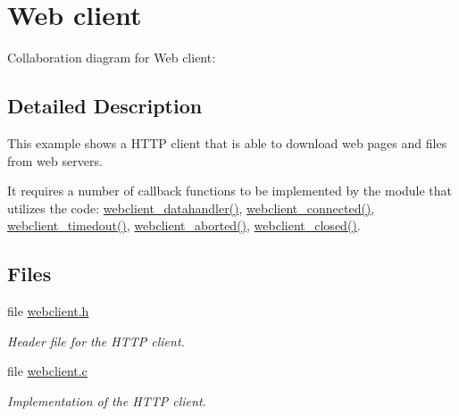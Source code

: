 \hypertarget{a00079}{
\section{Web client}
\label{a00079}
}


Collaboration diagram for Web client:

\subsection{Detailed Description}
This example shows a HTTP client that is able to download web pages and files from web servers. 

It requires a number of callback functions to be implemented by the module that utilizes the code: \hyperlink{a00079_gc4b119801e50cc1824498a1cdf9adc37}{webclient\_\-datahandler()}, \hyperlink{a00079_g6b942c1ef22f8cd1a726ef3364c9fbea}{webclient\_\-connected()}, \hyperlink{a00079_g23705efb9077187881f094fc9be13bde}{webclient\_\-timedout()}, \hyperlink{a00079_gf11d9915ec12a8cdd9fdcbb5e8fcd5c7}{webclient\_\-aborted()}, \hyperlink{a00079_gf8f12c820cc08da32aa62898bfc02db3}{webclient\_\-closed()}. 

\subsection*{Files}
\begin{CompactItemize}
\item 
file \hyperlink{a00049}{webclient.h}
\begin{CompactList}\small\item\em Header file for the HTTP client. \item\end{CompactList}

\item 
file \hyperlink{a00048}{webclient.c}
\begin{CompactList}\small\item\em Implementation of the HTTP client. \item\end{CompactList}

\end{CompactItemize}
